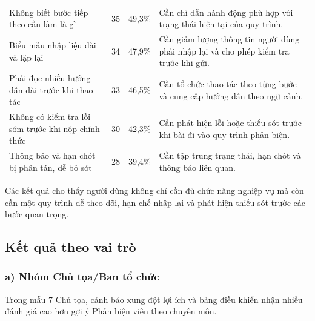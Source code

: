 \begin{center}
\setlength{\tabcolsep}{2pt}
\renewcommand{\arraystretch}{1.15}
\begin{tabular}{|P{0.28\textwidth}|C{0.14\textwidth}|C{0.18\textwidth}|P{0.32\textwidth}|}
\hline
{} &  &  &  \\ \hline
Không biết bước tiếp theo cần làm là gì & 35 & 49,3\% & Cần chỉ dẫn hành động phù hợp với trạng thái hiện tại của quy trình. \\ \hline
Biểu mẫu nhập liệu dài và lặp lại & 34 & 47,9\% & Cần giảm lượng thông tin người dùng phải nhập lại và cho phép kiểm tra trước khi gửi. \\ \hline
Phải đọc nhiều hướng dẫn dài trước khi thao tác & 33 & 46,5\% & Cần tổ chức thao tác theo từng bước và cung cấp hướng dẫn theo ngữ cảnh. \\ \hline
Không có kiểm tra lỗi sớm trước khi nộp chính thức & 30 & 42,3\% & Cần phát hiện lỗi hoặc thiếu sót trước khi bài đi vào quy trình phản biện. \\ \hline
Thông báo và hạn chót bị phân tán, dễ bỏ sót & 28 & 39,4\% & Cần tập trung trạng thái, hạn chót và thông báo liên quan. \\ \hline
\end{tabular}
\end{center}

Các kết quả cho thấy người dùng không chỉ cần đủ chức năng nghiệp vụ mà còn cần một quy trình dễ theo dõi, hạn chế nhập lại và phát hiện thiếu sót trước các bước quan trọng.

\subsection{Kết quả theo vai trò}

\subsubsection{a) Nhóm Chủ tọa/Ban tổ chức}

Trong mẫu 7 Chủ tọa, cảnh báo xung đột lợi ích và bảng điều khiển nhận nhiều đánh giá cao hơn gợi ý Phản biện viên theo chuyên môn.

